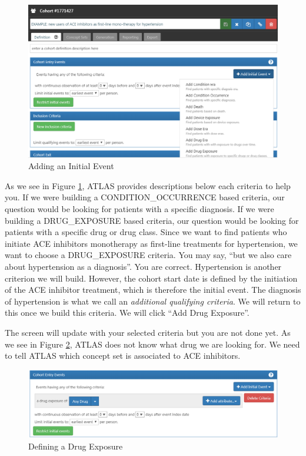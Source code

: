 \documentclass[11pt]{book}
\theoremstyle{definition}
\theoremstyle{definition}
\theoremstyle{definition}
\theoremstyle{remark}
\begin{document}
\begin{figure}

{\centering \includegraphics[width=1\linewidth]{images/Cohorts/ATLAS-initialevent} 

}

\caption{Adding an Initial Event}\label{fig:ATLASinitialevent}
\end{figure}

As we see in Figure \ref{fig:ATLASinitialevent}, ATLAS provides
descriptions below each criteria to help you. If we were building a
CONDITION\_OCCURRENCE based criteria, our question would be looking for
patients with a specific diagnosis. If we were building a DRUG\_EXPOSURE
based criteria, our question would be looking for patients with a
specific drug or drug class. Since we want to find patients who initiate
ACE inhibitors monotherapy as first-line treatments for hypertension, we
want to choose a DRUG\_EXPOSURE criteria. You may say, ``but we also
care about hypertension as a diagnosis''. You are correct. Hypertension
is another criterion we will build. However, the cohort start date is
defined by the initiation of the ACE inhibitor treatment, which is
therefore the initial event. The diagnosis of hypertension is what we
call an \emph{additional qualifying criteria}. We will return to this
once we build this criteria. We will click ``Add Drug Exposure''.

The screen will update with your selected criteria but you are not done
yet. As we see in Figure \ref{fig:ATLASdrugexposure}, ATLAS does not
know what drug we are looking for. We need to tell ATLAS which concept
set is associated to ACE inhibitors.

\begin{figure}

{\centering \includegraphics[width=1\linewidth]{images/Cohorts/ATLAS-drugexposure} 

}

\caption{Defining a Drug Exposure}\label{fig:ATLASdrugexposure}
\end{figure}
\end{document}
